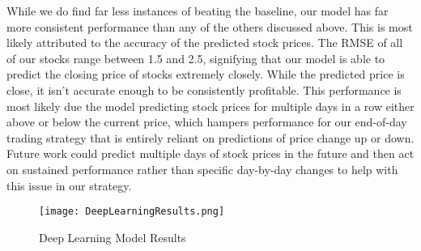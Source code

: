 \documentclass[../thesis.tex]{subfiles}
\begin{document}
While we do find far less instances of beating the baseline, our model has far more consistent performance than any of the others discussed above. This is most likely attributed to the accuracy of the predicted stock prices. The RMSE of all of our stocks range between 1.5 and 2.5, signifying that our model is able to predict the closing price of stocks extremely closely. While the predicted price is close, it isn't accurate enough to be consistently profitable. This performance is most likely due the model predicting stock prices for multiple days in a row either above or below the current price, which hampers performance for our end-of-day trading strategy that is entirely reliant on  predictions of price change up or down. Future work could predict multiple days of stock prices in the future and then act on sustained performance rather than specific day-by-day changes to help with this issue in our strategy. 

\begin{figure}[h]
\centering
\texttt{[image: DeepLearningResults.png]}
\caption{Deep Learning Model Results \label{overflow}}
\label{deepresults}
\end{figure}
\end{document}
